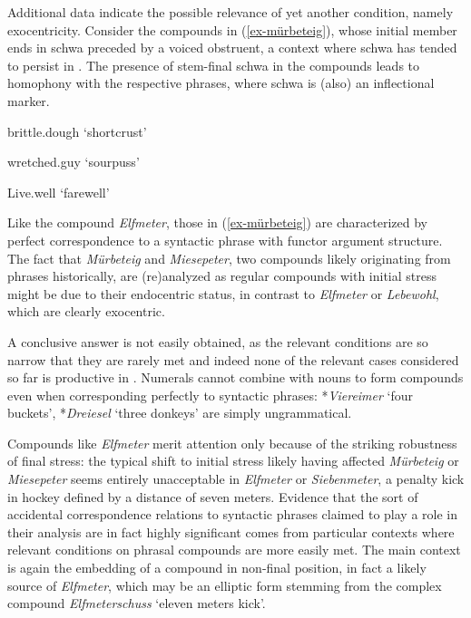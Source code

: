 \documentclass[output=paper
 ,nobabel
 ,draftmode
 ,colorlinks, citecolor=brown
]{langscibook}
\begin{document}
Additional data indicate the possible relevance of yet another condition, namely
exocentricity. Consider the compounds in (\ref{ex-mürbeteig}), whose initial member ends in schwa
preceded by a voiced obstruent, a context where schwa has tended to persist in . The presence
of stem-final schwa in the compounds leads to homophony with the respective phrases, where schwa is
(also) an inflectional marker.


\eal\label{ex-mürbeteig}
 

brittle.dough   
`shortcrust' 

 

wretched.guy     
`sourpuss' 

 

Live.well      
`farewell' 

\zl

\noindent
Like the compound \emph{Elfmeter}, those in (\ref{ex-mürbeteig}) are characterized by perfect
correspondence to a syntactic phrase with functor argument structure. The fact that \emph{Mürbeteig}
and \emph{Miesepeter}, two compounds likely originating from phrases historically, are (re)analyzed
as regular compounds with initial stress might be due to their endocentric status, in contrast to
\emph{Elfmeter} or \emph{Lebewohl}, which are clearly exocentric. 

A conclusive answer is not easily obtained, as the relevant conditions are so narrow that they are
rarely met and indeed none of the relevant cases considered so far is productive in . Numerals
cannot combine with nouns to form compounds even when corresponding perfectly to syntactic phrases:
*\emph{Viereimer} `four buckets', *\emph{Dreiesel} `three donkeys' are simply ungrammatical.  

Compounds like \emph{Elfmeter} merit attention only because of the striking robustness of final
stress: the typical shift to initial stress likely having affected \emph{Mürbeteig} or
\emph{Miesepeter} seems entirely unacceptable in \emph{Elfmeter} or \emph{Siebenmeter}, a penalty
kick in hockey defined by a distance of seven meters. Evidence that the sort of accidental
correspondence relations to syntactic phrases claimed to play a role in their analysis are in fact
highly significant comes from particular contexts where relevant conditions on phrasal compounds are
more easily met. The main context is again the embedding of a compound in non-final position, in
fact a likely source of \emph{Elfmeter}, which may be an elliptic form stemming from the complex
compound \emph{Elfmeterschuss} `eleven meters kick'.  
\end{document}
